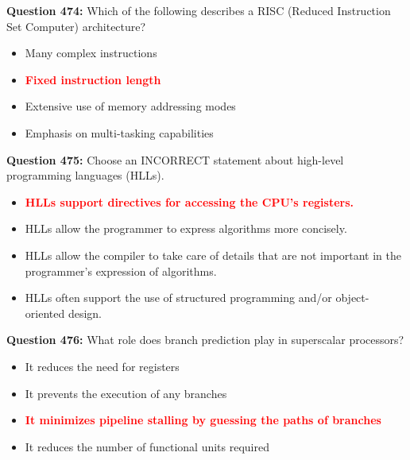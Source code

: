 \documentclass[12pt,a4paper]{article}
\begin{document}
\vspace{0.5cm}

\textbf{Question 474:} Which of the following describes a RISC (Reduced Instruction Set Computer) architecture?

\begin{itemize}
    \item[\textbf{A.}] Many complex instructions
    \item[\textbf{B.}] \textcolor{red}{\textbf{Fixed instruction length}}
    \item[\textbf{C.}] Extensive use of memory addressing modes
    \item[\textbf{D.}] Emphasis on multi-tasking capabilities
\end{itemize}

\vspace{0.5cm}

\textbf{Question 475:} Choose an INCORRECT statement about high-level programming languages (HLLs).

\begin{itemize}
    \item[\textbf{A.}] \textcolor{red}{\textbf{HLLs support directives for accessing the CPU's registers.}}
    \item[\textbf{B.}] HLLs allow the programmer to express algorithms more concisely.
    \item[\textbf{C.}] HLLs allow the compiler to take care of details that are not important in the programmer's expression of algorithms.
    \item[\textbf{D.}] HLLs often support the use of structured programming and/or object-oriented design.
\end{itemize}

\vspace{0.5cm}

\textbf{Question 476:} What role does branch prediction play in superscalar processors?

\begin{itemize}
    \item[\textbf{A.}] It reduces the need for registers
    \item[\textbf{B.}] It prevents the execution of any branches
    \item[\textbf{C.}] \textcolor{red}{\textbf{It minimizes pipeline stalling by guessing the paths of branches}}
    \item[\textbf{D.}] It reduces the number of functional units required
\end{itemize}
\end{document}

